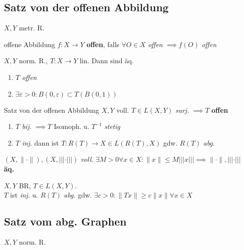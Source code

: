 \subsection{Satz von der offenen Abbildung}
$X,Y$ metr. R.

\begin{definition}{offene Abbildung}
  $f:X\to Y$ \textbf{offen}, falls $\forall O \in X$ \textit{offen}
  $\implies f(O)$ \textit{offen}
\end{definition}

\begin{lemma}
  $X,Y$ norm. R., $T:X \to Y$ lin. Dann sind äq.
  \begin{enumerate}[label = (\roman*)]
    \item $T$ \textit{offen}
    \item $\exists \varepsilon > 0 : B(0,\varepsilon) \subset T(B(0,1))$
  \end{enumerate}
\end{lemma}

\begin{satz}{Satz von der offenen Abbildung}
  $X,Y$ voll. $T \in L(X,Y)$ \textit{surj.} $\implies T$ \textbf{offen}
\end{satz}

\begin{korrolar}
  \begin{enumerate}[label = (\roman*)]
    \item \(T\) \textit{bij.} \(\implies T\) Isomoph. u. \(T^{-1}\) 
      \textit{stetig}
    \item \(T\) \textit{inj.} dann ist \(T:R(T) \to X \in L(R(T),X)\) gdw.
      \(R(T)\) \textit{abg.}
  \end{enumerate}
\end{korrolar}

\begin{korrolar}
  $(X,\|\cdot\|),(X,|||\cdot|||)$ \textit{voll.}
  $\exists M > 0 \forall x\in X: \|x\| \leq M |||x|||
  \implies \|\cdot\|,|||\cdot|||$ \textbf{äq.}
\end{korrolar}

\begin{korrolar}
  \(X,Y\) BR, \(T\in L(X,Y)\).\\
  \(T\) ist \textit{inj.} u. \(R(T)\) \textit{abg.} gdw. 
  \(\exists c > 0: \|Tx\| \geq c\|x\| \forall x\in X\)
\end{korrolar}

\subsection{Satz vom abg. Graphen}
$X,Y$ norm. R.

